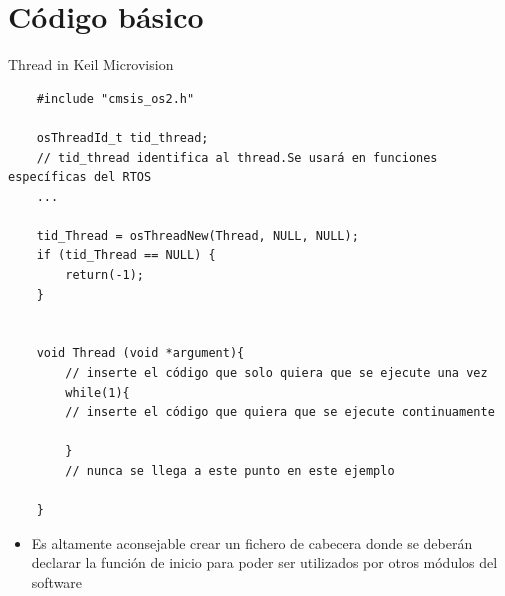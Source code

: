 \section{Código básico}
\begin{frame}[fragile]{Thread in Keil Microvision}
    \begin{verbatim}
    #include "cmsis_os2.h"
    
    osThreadId_t tid_thread; 
    // tid_thread identifica al thread.Se usará en funciones específicas del RTOS
    ...
    
    tid_Thread = osThreadNew(Thread, NULL, NULL);
    if (tid_Thread == NULL) {
        return(-1);
    }


    void Thread (void *argument){
        // inserte el código que solo quiera que se ejecute una vez
        while(1){
        // inserte el código que quiera que se ejecute continuamente
        
        }
        // nunca se llega a este punto en este ejemplo
    
    }
    \end{verbatim}
    \begin{itemize}
        \item Es altamente aconsejable crear un fichero de cabecera donde se deberán declarar la función de inicio para poder ser utilizados por otros módulos del software

    \end{itemize}
\end{frame}

